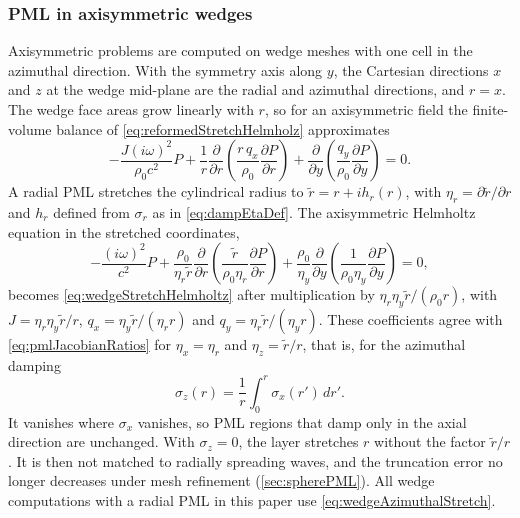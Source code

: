 \documentclass[final,12pt,nopreprintline,longtitle]{elsarticle}
\begin{document}
\subsubsection{PML in axisymmetric wedges}
\label{sec:wedgePML}

Axisymmetric problems are computed on wedge meshes with one cell in the
azimuthal direction.  With the symmetry axis along $y$, the Cartesian
directions $x$ and $z$ at the wedge mid-plane are the radial and azimuthal
directions, and $r=x$.  The wedge face areas grow linearly with $r$, so for
an axisymmetric field the finite-volume balance of
\cref{eq:reformedStretchHelmholz} approximates
\begin{equation}
    -\frac{J(i\omega)^2}{\rho_0c^2}P
    +\frac{1}{r}\frac{\partial}{\partial r}
    \left(\frac{r\,q_x}{\rho_0}\frac{\partial P}{\partial r}\right)
    +\frac{\partial}{\partial y}
    \left(\frac{q_y}{\rho_0}\frac{\partial P}{\partial y}\right)=0.
    \label{eq:wedgeStretchHelmholtz}
\end{equation}
A radial PML stretches the cylindrical radius to
$\tilde r=r+ih_r(r)$, with $\eta_r=\partial\tilde r/\partial r$ and $h_r$
defined from $\sigma_r$ as in \cref{eq:dampEtaDef}.  The axisymmetric
Helmholtz equation in the stretched coordinates,
\begin{equation}
    -\frac{(i\omega)^2}{c^2}P
    +\frac{\rho_0}{\eta_r\tilde r}\frac{\partial}{\partial r}
    \left(\frac{\tilde r}{\rho_0\eta_r}\frac{\partial P}{\partial r}\right)
    +\frac{\rho_0}{\eta_y}\frac{\partial}{\partial y}
    \left(\frac{1}{\rho_0\eta_y}\frac{\partial P}{\partial y}\right)=0,
    \label{eq:radialStretchHelmholtz}
\end{equation}
becomes \cref{eq:wedgeStretchHelmholtz} after multiplication by
$\eta_r\eta_y\tilde r/(\rho_0r)$, with
$J=\eta_r\eta_y\tilde r/r$, $q_x=\eta_y\tilde r/(\eta_rr)$ and
$q_y=\eta_r\tilde r/(\eta_yr)$.  These coefficients agree with
\cref{eq:pmlJacobianRatios} for $\eta_x=\eta_r$ and $\eta_z=\tilde r/r$,
that is, for the azimuthal damping
\begin{equation}
    \sigma_z(r)=\frac{1}{r}\int_0^r\sigma_x(r')\,dr'.
    \label{eq:wedgeAzimuthalStretch}
\end{equation}
It vanishes where $\sigma_x$ vanishes, so PML regions that damp only in the
axial direction are unchanged.  With $\sigma_z=0$, the layer stretches $r$
without the factor $\tilde r/r$.  It is then not matched to radially
spreading waves, and the truncation error no longer decreases under mesh
refinement (\cref{sec:spherePML}).  All wedge computations with a radial PML
in this paper use \cref{eq:wedgeAzimuthalStretch}.
\end{document}
